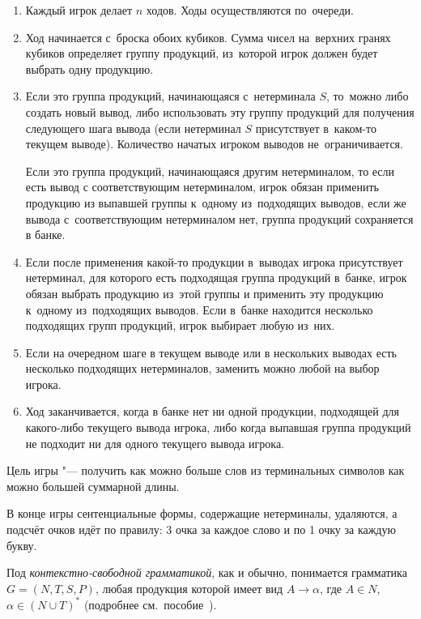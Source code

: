 \documentclass{csmathnotes}
\begin{document}
\begin{enumerate}
	\item Каждый игрок делает $n$ ходов. Ходы осуществляются по~очереди.
	\item Ход начинается с~броска обоих кубиков. Сумма чисел на~верхних гранях кубиков определяет группу продукций, из~которой игрок должен будет выбрать одну продукцию.
	\item Если это группа продукций, начинающаяся с~нетерминала $S$, то~можно либо создать новый вывод, либо использовать эту группу продукций для получения следующего шага вывода (если нетерминал $S$ присутствует в~каком-то текущем выводе). Количество начатых игроком выводов не~ограничивается.
	
	Если это группа продукций, начинающаяся другим нетерминалом, то если есть вывод с соответствующим нетерминалом, игрок обязан применить продукцию из выпавшей группы к~одному из~подходящих выводов, если же вывода с~соответствующим нетерминалом нет, группа продукций сохраняется в банке.
	\item Если после применения какой-то продукции в~выводах игрока присутствует нетерминал, для которого есть подходящая группа продукций в~банке, игрок обязан выбрать продукцию из~этой группы и применить эту продукцию к~одному из~подходящих выводов. Если в~банке находится несколько подходящих групп продукций, игрок выбирает любую из~них.
	\item Если на очередном шаге в текущем выводе или в нескольких выводах есть несколько подходящих нетерминалов, заменить можно любой на выбор игрока.
	\item Ход заканчивается, когда в банке нет ни одной продукции, подходящей для какого-либо текущего вывода игрока, либо когда выпавшая группа продукций не подходит ни для одного текущего вывода игрока.
\end{enumerate}

Цель игры "--- получить как можно больше слов из терминальных символов как можно большей суммарной длины.

В конце игры сентенциальные формы, содержащие нетерминалы, удаляются, а подсчёт очков идёт по правилу: 3 очка за каждое слово и по 1 очку за каждую букву.

Под \textit{контекстно-свободной грамматикой}, как и обычно, понимается грамматика $G=(N,T,S,P)$, любая продукция которой имеет вид $A \rightarrow \alpha$, где $ A \in N $, $\alpha \in (N \cup T)^* $ (подробнее см.~пособие~\cite{Sokolov:2014}).

\end{document}
